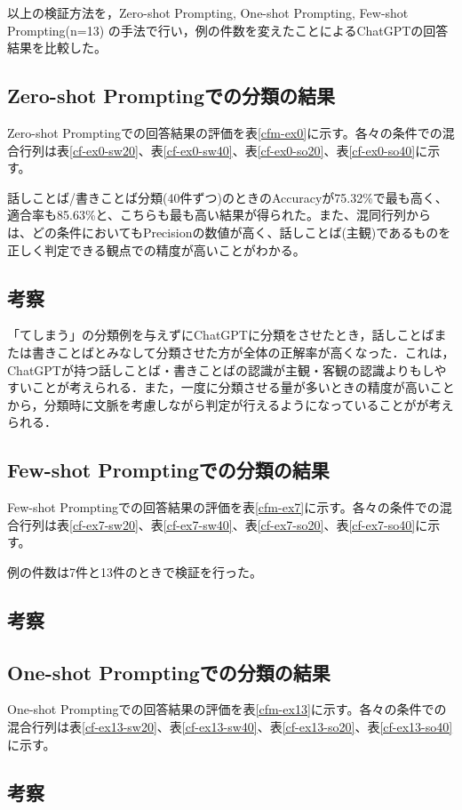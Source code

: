 以上の検証方法を，Zero-shot Prompting, One-shot Prompting, Few-shot Prompting(n=13) の手法で行い，例の件数を変えたことによるChatGPTの回答結果を比較した。

\subsection{Zero-shot Promptingでの分類の結果}
Zero-shot Promptingでの回答結果の評価を表\ref{cfm-ex0}に示す。各々の条件での混合行列は表\ref{cf-ex0-sw20}、表\ref{cf-ex0-sw40}、表\ref{cf-ex0-so20}、表\ref{cf-ex0-so40}に示す。






話しことば/書きことば分類(40件ずつ)のときのAccuracyが75.32\%で最も高く、適合率も85.63\%と、こちらも最も高い結果が得られた。また、混同行列からは、どの条件においてもPrecisionの数値が高く、話しことば(主観)であるものを正しく判定できる観点での精度が高いことがわかる。

\subsection{考察}
「てしまう」の分類例を与えずにChatGPTに分類をさせたとき，話しことばまたは書きことばとみなして分類させた方が全体の正解率が高くなった．これは，ChatGPTが持つ話しことば・書きことばの認識が主観・客観の認識よりもしやすいことが考えられる．また，一度に分類させる量が多いときの精度が高いことから，分類時に文脈を考慮しながら判定が行えるようになっていることがが考えられる．



\subsection{Few-shot Promptingでの分類の結果}
Few-shot Promptingでの回答結果の評価を表\ref{cfm-ex7}に示す。各々の条件での混合行列は表\ref{cf-ex7-sw20}、表\ref{cf-ex7-sw40}、表\ref{cf-ex7-so20}、表\ref{cf-ex7-so40}に示す。

例の件数は7件と13件のときで検証を行った。







\subsection{考察}

\subsection{One-shot Promptingでの分類の結果}
One-shot Promptingでの回答結果の評価を表\ref{cfm-ex13}に示す。各々の条件での混合行列は表\ref{cf-ex13-sw20}、表\ref{cf-ex13-sw40}、表\ref{cf-ex13-so20}、表\ref{cf-ex13-so40}に示す。







\subsection{考察}